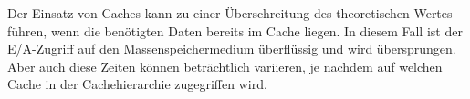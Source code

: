 Der Einsatz von Caches kann zu einer Überschreitung des theoretischen Wertes führen, wenn die benötigten Daten bereits im Cache liegen. In diesem Fall ist der E/A-Zugriff auf den Massenspeichermedium überflüssig und wird übersprungen. Aber auch diese Zeiten können beträchtlich variieren, je nachdem auf welchen Cache in der Cachehierarchie zugegriffen wird. 






\bigskip

\textit{}

